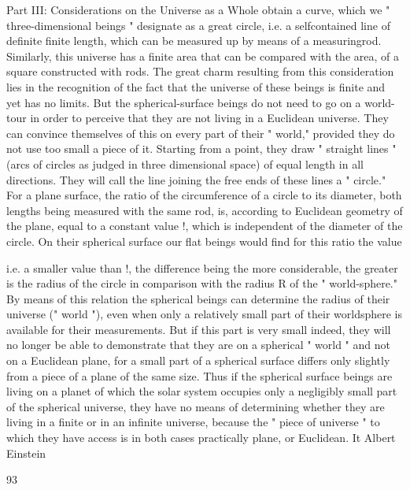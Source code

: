 \documentclass{article}
\begin{document}
Part III: Considerations on the Universe as a Whole
obtain a curve, which we " three-dimensional beings " designate as a great circle, i.e. a selfcontained line of definite finite length, which can be measured up by means of a measuringrod. Similarly, this universe has a finite area that can be compared with the area, of a square
constructed with rods. The great charm resulting from this consideration lies in the
recognition of the fact that the universe of these beings is finite and yet has no limits.
But the spherical-surface beings do not need to go on a world-tour in order to perceive
that they are not living in a Euclidean universe. They can convince themselves of this on
every part of their " world," provided they do not use too small a piece of it. Starting from a
point, they draw " straight lines " (arcs of circles as judged in three dimensional space) of
equal length in all directions. They will call the line joining the free ends of these lines a "
circle." For a plane surface, the ratio of the circumference of a circle to its diameter, both
lengths being measured with the same rod, is, according to Euclidean geometry of the plane,
equal to a constant value !, which is independent of the diameter of the circle. On their
spherical surface our flat beings would find for this ratio the value

i.e. a smaller value than !, the difference being the more considerable, the greater is the
radius of the circle in comparison with the radius R of the " world-sphere." By means of this
relation the spherical beings can determine the radius of their universe (" world "), even
when only a relatively small part of their worldsphere is available for their measurements.
But if this part is very small indeed, they will no longer be able to demonstrate that they are
on a spherical " world " and not on a Euclidean plane, for a small part of a spherical surface
differs only slightly from a piece of a plane of the same size.
Thus if the spherical surface beings are living on a planet of which the solar system
occupies only a negligibly small part of the spherical universe, they have no means of
determining whether they are living in a finite or in an infinite universe, because the " piece
of universe " to which they have access is in both cases practically plane, or Euclidean. It
Albert Einstein

93
\end{document}
